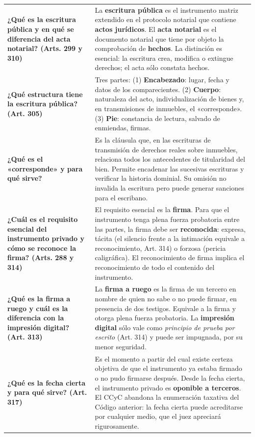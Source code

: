 \documentclass[12pt,oneside]{book}
\begin{document}
\begin{longtable}{@{}     >{\raggedright\arraybackslash}p{}     >{\raggedright\arraybackslash}p{} @{}}
\textbf{¿Qué es la escritura pública y en qué se diferencia del acta notarial? (Arts. 299 y 310)} &
La \textbf{escritura pública} es el instrumento matriz extendido en el protocolo notarial que contiene \textbf{actos jurídicos}. El \textbf{acta notarial} es el documento notarial que tiene por objeto la comprobación de \textbf{hechos}. La distinción es esencial: la escritura crea, modifica o extingue derechos; el acta sólo constata hechos. \\[6pt]

\textbf{¿Qué estructura tiene la escritura pública? (Art. 305)} &
Tres partes: (1) \textbf{Encabezado}: lugar, fecha y datos de los comparecientes. (2) \textbf{Cuerpo}: naturaleza del acto, individualización de bienes y, en transmisiones de inmuebles, el «corresponde». (3) \textbf{Pie}: constancia de lectura, salvado de enmiendas, firmas. \\[6pt]

\textbf{¿Qué es el «corresponde» y para qué sirve?} &
Es la cláusula que, en las escrituras de transmisión de derechos reales sobre inmuebles, relaciona todos los antecedentes de titularidad del bien. Permite encadenar las sucesivas escrituras y verificar la historia dominial. Su omisión no invalida la escritura pero puede generar sanciones para el escribano. \\[6pt]

\textbf{¿Cuál es el requisito esencial del instrumento privado y cómo se reconoce la firma? (Arts. 288 y 314)} &
El requisito esencial es la \textbf{firma}. Para que el instrumento tenga plena fuerza probatoria entre las partes, la firma debe ser \textbf{reconocida}: expresa, tácita (el silencio frente a la intimación equivale a reconocimiento, Art. 314) o forzosa (pericia caligráfica). El reconocimiento de firma implica el reconocimiento de todo el contenido del instrumento. \\[6pt]

\textbf{¿Qué es la firma a ruego y cuál es la diferencia con la impresión digital? (Art. 313)} &
La \textbf{firma a ruego} es la firma de un tercero en nombre de quien no sabe o no puede firmar, en presencia de dos testigos. Equivale a la firma y otorga plena fuerza probatoria. La \textbf{impresión digital} sólo vale como \emph{principio de prueba por escrito} (Art. 314) y puede ser impugnada, por su menor seguridad. \\[6pt]

\textbf{¿Qué es la fecha cierta y para qué sirve? (Art. 317)} &
Es el momento a partir del cual existe certeza objetiva de que el instrumento ya estaba firmado o no pudo firmarse después. Desde la fecha cierta, el instrumento privado es \textbf{oponible a terceros}. El CCyC abandona la enumeración taxativa del Código anterior: la fecha cierta puede acreditarse por cualquier medio, que el juez apreciará rigurosamente. \\[6pt]


\end{longtable}
\end{document}
